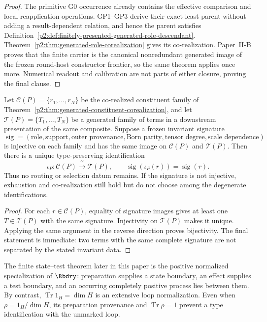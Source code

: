 \documentclass[12pt,a4paper]{article}
\begin{document}
\begin{proof}
The primitive G0 occurrence already contains the effective comparison and
local reapplication operations.  GP1--GP3 derive their exact least parent
without adding a result-dependent relation, and hence the parent satisfies
Definition~\ref{p2:def:finitely-presented-generated-role-descendant}.
Theorem~\ref{p2:thm:generated-role-corealization} gives its co-realization.
Paper~II-B proves that the finite carrier is the canonical nonredundant
generated image of the frozen round-host constructor frontier, so the same
theorem applies once more.  Numerical readout and calibration are not parts
of either closure, proving the final clause.
\end{proof}

\begin{corollary}
\label{p2:cor:canonical-constituent-identification}
Let \(\mathcal C(P)=\{r_1,\ldots,r_N\}\) be the co-realized constituent
family of Theorem~\ref{p2:thm:generated-constituent-corealization}, and let
\(\mathcal T(P)=\{T_1,\ldots,T_N\}\) be a generated family of terms in a
downstream presentation of the same composite.  Suppose a frozen invariant
signature
\[
 \operatorname{sig}
 =(
   \text{role},\text{support},\text{outer provenance},
   \text{Born parity},\text{tensor degree},\text{scale dependence})
\]
is injective on each family and has the same image on
\(\mathcal C(P)\) and \(\mathcal T(P)\).  Then there is a unique
type-preserving identification
\[
 \iota_P:\mathcal C(P)\xrightarrow{\ \cong\ }\mathcal T(P),
 \qquad
 \operatorname{sig}(\iota_P(r))=\operatorname{sig}(r).
\]
Thus no routing or selection datum remains.  If the signature is not
injective, exhaustion and co-realization still hold but do not choose among
the degenerate identifications.
\end{corollary}

\begin{proof}
For each \(r\in\mathcal C(P)\), equality of signature images gives at least
one \(T\in\mathcal T(P)\) with the same signature.  Injectivity on
\(\mathcal T(P)\) makes it unique.  Applying the same argument in the reverse
direction proves bijectivity.  The final statement is immediate: two terms
with the same complete signature are not separated by the stated invariant
data.
\end{proof}

\begin{remark}
The finite state--test theorem later in this paper is the positive normalized
specialization of \(\Rbdry\): preparation supplies a state boundary, an
effect supplies a test boundary, and an occurring completely positive process
lies between them.  By contrast, \(\operatorname{Tr}1_H=\dim H\) is an
extensive loop normalization.  Even when
\(\rho=1_H/\dim H\), its preparation provenance and
\(\operatorname{Tr}\rho=1\) prevent a type identification with the unmarked
loop.
\end{remark}
\end{document}

